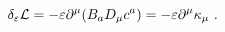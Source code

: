 \begin{equation}
\delta_{\varepsilon} {\cal{L}} = - \varepsilon \partial^{\mu}
(B_{a} D_{\mu} c^{a}) = - \varepsilon\partial^{\mu} \kappa_{\mu}~.       \label{eq:byuzotuzdort} 
\end{equation}

